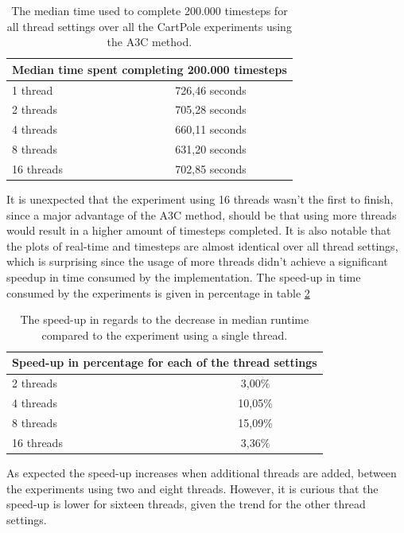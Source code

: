 \documentclass[11pt]{article}
\begin{document}
\begin{table}[H]
    \centering
 \begin{tabular}{ |l|c| }
  \hline
  \multicolumn{2}{|c|}{Median time spent completing 200.000 timesteps} \\
  \hline
  1 thread & 726,46 seconds \\
  \hline
  2 threads & 705,28 seconds \\
  \hline
  4 threads & 660,11 seconds \\
  \hline
  8 threads & 631,20 seconds \\
  \hline
  16 threads & 702,85 seconds \\
  \hline
 \end{tabular}
 \caption{The median time used to complete 200.000 timesteps
 for all thread settings over all the CartPole experiments using the A3C method.}
    \label{tab:time}
\end{table}

It is unexpected that the experiment using 16 threads wasn't the first to finish,
since a major advantage of the A3C method,
should be that using more threads would result in a higher amount of timesteps completed.
It is also notable that the plots of real-time and timesteps are almost identical
over all thread settings, which is surprising since the usage of more
threads didn't achieve a significant speedup
in time consumed by the implementation.
The speed-up in time consumed by the experiments
is given in percentage in table \ref{tab:cp_compare}

\begin{table}[H]
    \centering
 \begin{tabular}{ |l|c| }
  \hline
  \multicolumn{2}{|c|}{Speed-up in percentage for each of the thread settings} \\
  \hline
  2 threads & 3,00\%\\
  \hline
  4 threads & 10,05\%\\
  \hline
  8 threads & 15,09\% \\
  \hline
  16 threads & 3,36\% \\
  \hline
 \end{tabular}
 \caption{The speed-up in regards to the decrease in median runtime compared to
 the experiment using a single thread.}
    \label{tab:cp_compare}
\end{table}

As expected the speed-up increases when additional threads are added, between the experiments using
two and eight threads.
However, it is curious that the speed-up is lower for sixteen threads, given the
trend for the other thread settings.
\end{document}
